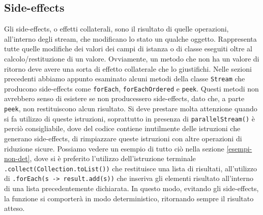 		\subsection{Side-effects}
			Gli side-effects, o effetti collaterali, sono il risultato di quelle operazioni, all'interno degli stream, che modificano lo stato un qualche oggetto. Rappresenta tutte quelle modifiche dei valori dei campi di istanza o di classe eseguiti oltre al calcolo/restituzione di un valore. Ovviamente, un metodo che non ha un valore di ritorno deve avere una sorta di effetto collaterale che lo giustifichi. Nelle sezioni precedenti abbiamo appunto esaminato alcuni metodi della classe \lstinline|Stream| che producono side-effects come \lstinline|forEach|, \lstinline|forEachOrdered| e \lstinline|peek|. Questi metodi non avrebbero senso di esistere se non producessero side-effects, dato che, a parte \lstinline|peek|, non restituiscono alcun risultato. Si deve prestare molta attenzione quando si fa utilizzo di queste istruzioni, soprattutto in presenza di \lstinline|parallelStream()| è perciò consigliabile, dove del codice contiene inutilmente delle istruzioni che generano side-effects, di rimpiazzare queste istruzioni con altre operazioni di riduzione sicure.
			Possiamo vedere un esempio di tutto ciò nella sezione \ref{esempi-non-det}, dove si è preferito l'utilizzo dell'istruzione terminale \lstinline|.collect(Collection.toList())| che restituisce una lista di risultati, all'utilizzo di \lstinline|.forEach(s -> result.add(s))| che inseriva gli elementi risultato all'interno di una lista precedentemente dichiarata. In questo modo, evitando gli side-effects, la funzione si comporterà in modo deterministico, ritornando sempre il risultato atteso.
			
